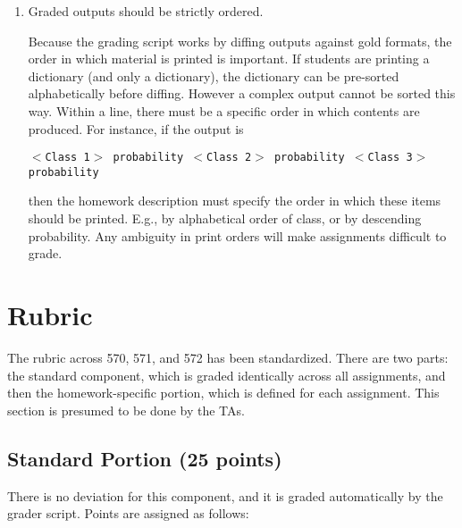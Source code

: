 \documentclass[12pt]{article}
\begin{document}
\begin{enumerate}
{  The more detailed the output description, the better. }
  
\item {Graded outputs should be strictly ordered.

Because the grading script works by diffing outputs against gold formats, the order in which material is printed is important. If students are printing a dictionary (and only a dictionary), the dictionary can be pre-sorted alphabetically before diffing. However a complex output cannot be sorted this way. Within a line, there must be a specific order in which contents are produced. For instance, if the output is


\texttt{$<$Class 1$>$ probability $<$Class 2$>$ probability $<$Class 3$>$ probability}

\noindent then the homework description must specify the order in which these items should be printed. E.g., by alphabetical order of class, or by descending probability. Any ambiguity in print orders will make assignments difficult to grade.
 }
\end{enumerate}

\section{Rubric} \label{sec:rubric}

The rubric across 570, 571, and 572 has been standardized. There are two parts: the standard component, which is graded identically across all assignments, and then the homework-specific portion, which is defined for each assignment. This section is presumed to be done by the TAs.

\subsection{Standard Portion (25 points)} \label{sec:standardrubric}

There is no deviation for this component, and it is graded automatically by the grader script. Points are assigned as follows:
\end{document}
